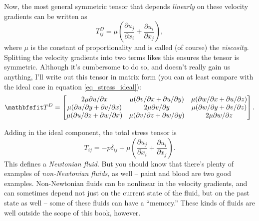 Now, the most general symmetric tensor that depends \emph{linearly} on these velocity gradients can be written as
\begin{equation}
T_{ij}^D = \mu \left( \frac{\partial u_j}{\partial x_i} + \frac{\partial u_i}{\partial x_j} \right),
\end{equation}
where $\mu$ is the constant of proportionality and is called (of course) the \emph{viscosity}.  Splitting the velocity gradients into two terms likes this ensures the tensor is symmetric.  Although it's cumbersome to do so, and doesn't really gain us anything, I'll write out this tensor in matrix form (you can at least compare with the ideal case in equation \ref{eq_stress_ideal}):
\[
\tens{T}^D = \begin{bmatrix}
2 \mu \partial u / \partial x  &  \mu (\partial v / \partial x + \partial u / \partial y)  &   \mu (\partial w / \partial x + \partial u / \partial z) \\
\mu (\partial u / \partial y + \partial v / \partial x)  & 2\mu  \partial v / \partial y  &  \mu (\partial w / \partial y + \partial v / \partial z) \\
\mu (\partial u / \partial z + \partial w / \partial x)  &  \mu (\partial v / \partial z + \partial w / \partial y) & 2\mu  \partial w / \partial z
\end{bmatrix}.
\label{eq_stress_newtonian}
\]

Adding in the ideal component, the total stress tensor is
\begin{equation}
\boxed{
T_{ij} = -p \delta_{ij} +  \mu \left( \frac{\partial u_j}{\partial x_i} + \frac{\partial u_i}{\partial x_j} \right).
}
\end{equation}
This defines a \emph{Newtonian fluid}.  But you should know that there's plenty of examples of \emph{non-Newtonian fluids,} as well -- paint and blood are two good examples.  Non-Newtonian fluids can be nonlinear in the velocity gradients, and can sometimes depend not just on the current state of the fluid, but on the past state as well -- some of these fluids can have a ``memory.''  These kinds of fluids are well outside the scope of this book, however.

